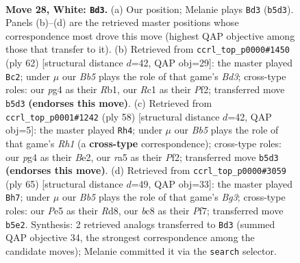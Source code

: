 \documentclass[11pt]{article}
\begin{document}
\clearpage

\begin{figure}[p]\centering
\begin{subfigure}{0.46\textwidth}\centering
\resizebox{\linewidth}{!}{%
\newchessgame
\chessboard[
  setfen={1nb4r/6k1/1p2p1p1/rB2P1N1/5pp1/5P2/2P3P1/2RN1K2 w - - 1 28},
  showmover=false,
  pgfstyle=straightmove, color=movearrow, markmove={b5-d3}
]}
\caption{}
\end{subfigure}\hfill
\begin{subfigure}{0.46\textwidth}\centering
\resizebox{\linewidth}{!}{%
\newchessgame
\chessboard[
  setfen={2b3k1/3n1pb1/6p1/3P4/3r3p/B2BN2P/1p3PP1/1R4K1 w - - 2 32},
  showmover=false,
  pgfstyle=straightmove, color=movearrow, markmove={d3-c2}
]}
\caption{}
\end{subfigure}
\\[4pt]
\begin{subfigure}{0.46\textwidth}\centering
\resizebox{\linewidth}{!}{%
\newchessgame
\chessboard[
  setfen={5bk1/7p/p1n1p1pP/1pr5/8/P4NP1/1P2BP2/4K2R w K - 0 30},
  showmover=false,
  pgfstyle=straightmove, color=movearrow, markmove={h1-h4}
]}
\caption{}
\end{subfigure}\hfill
\begin{subfigure}{0.46\textwidth}\centering
\resizebox{\linewidth}{!}{%
\newchessgame
\chessboard[
  setfen={3r2k1/5p2/3P2bp/p1p4P/3np1B1/8/PP2NP2/5KR1 b - - 0 33},
  showmover=false,
  pgfstyle=straightmove, color=movearrow, markmove={g6-h7}
]}
\caption{}
\end{subfigure}
\caption{\textbf{Move 28, White: \texttt{Bd3}.} (a) Our position; Melanie plays \texttt{Bd3} (\texttt{b5d3}). Panels (b)--(d) are the retrieved master positions whose correspondence most drove this move (highest QAP objective among those that transfer to it). (b) Retrieved from \texttt{ccrl\_top\_p0000\#1450} (ply 62) [structural distance $d$=42, QAP obj=29]: the master played \texttt{Bc2}; under $\mu$ our \emph{Bb5} plays the role of that game's \emph{Bd3}; cross-type roles: our \emph{p}g4 as their \emph{R}b1, our \emph{R}c1 as their \emph{P}f2; transferred move \texttt{b5d3} \textbf{(endorses this move)}. (c) Retrieved from \texttt{ccrl\_top\_p0001\#1242} (ply 58) [structural distance $d$=42, QAP obj=5]: the master played \texttt{Rh4}; under $\mu$ our \emph{Bb5} plays the role of that game's \emph{Rh1} (a \textbf{cross-type} correspondence); cross-type roles: our \emph{p}g4 as their \emph{B}e2, our \emph{r}a5 as their \emph{P}f2; transferred move \texttt{b5d3} \textbf{(endorses this move)}. (d) Retrieved from \texttt{ccrl\_top\_p0000\#3059} (ply 65) [structural distance $d$=49, QAP obj=33]: the master played \texttt{Bh7}; under $\mu$ our \emph{Bb5} plays the role of that game's \emph{Bg3}; cross-type roles: our \emph{P}e5 as their \emph{R}d8, our \emph{b}c8 as their \emph{P}f7; transferred move \texttt{b5e2}. Synthesis: 2 retrieved analogs transferred to \texttt{Bd3} (summed QAP objective 34, the strongest correspondence among the candidate moves); Melanie committed it via the \texttt{search} selector.}
\label{fig:thought-m54}
\end{figure}
\end{document}
